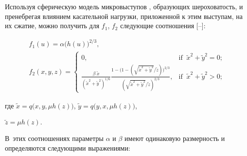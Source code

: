 
Используя сферическую модель микровыступов \cite{al:bib16}, образующих шероховатость, и пренебрегая влиянием касательной нагрузки, приложенной к этим выступам, на их сжатие, можно получить для $f_{1} $, $f_{2} $ следующие соотношения [--]:

\begin{equation} 

\label{GrindEQ__4_} 

\begin{array}{l} 

f_{1}(u)=\alpha \bigl( h(u) \bigr) ^{{2}/{3}} , 

\\ 

f_{2}(x,y,z){=}\left\{\begin{array}{cl} 

0, & \textrm{if}\; \; \tilde{x}^{2} +\tilde{y}^{2} =0; 

\\[2mm] 

\displaystyle

\frac{\beta \;  \tilde{x}}{(\tilde{x}^{2} +\tilde{y}^{2} )^{{1}/{6} } }  

\frac{1-\bigl(1-({\sqrt{\tilde{x}^{2} +\tilde{y}^{2} }/\tilde{z}})\bigr)^{{2}/{3}}}

{({\sqrt{\tilde{x}^{2} +\tilde{y}^{2}}/\tilde{z}})^{{2}/{3}}},

&

\textrm{if}\; \; \tilde{x}^{2} +\tilde{y}^{2} >0;

\end{array}\right. 

\end{array}

\end{equation}

где $\tilde{x}=q\bigl(x, y, \mu  h(z)\bigr)$, $\tilde{y}=q\bigl(y, x, \mu  h(z)\bigr)$, 

$\tilde{z}=\mu  h(z)$. 

В~этих соотношениях параметры $\alpha $ и $\beta $ имеют одинаковую размерность и определяются следующими выражениями:

